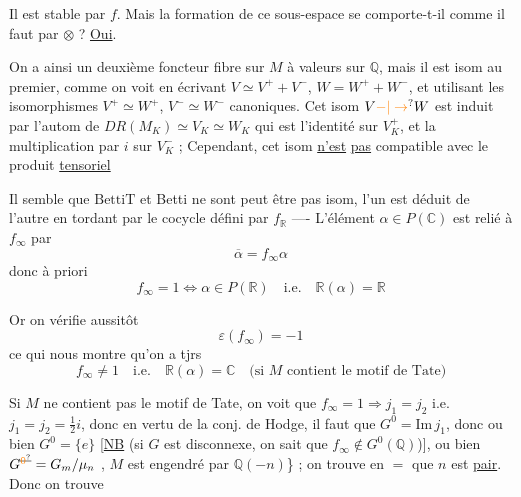 
Il est stable par $f$. Mais
la formation de ce sous-espace
 se comporte-t-il comme
il faut par $\otimes$ ? \uline{Oui}.

On a ainsi un deuxième foncteur fibre sur $M$
à valeurs sur $\mathbb Q$, mais il est isom  au
premier,  comme on voit en écrivant
$V\simeq V^++V^-$, $W=W^++W^-$, et utilisant les
isomorphismes $V^+\simeq W^+$, $V^-\simeq W^-$ canoniques.
Cet isom $V\unsure{-|\to}W$ est  induit par l'autom
de $DR(M_K)\simeq V_K\simeq W_K$ qui est l'identité sur
$V_K^+$, et la multiplication par $i$ sur $V_K^-$ ; Cependant, cet
isom \uline{n'est} \uline{pas} compatible avec le produit \uline{tensoriel}

Il semble que $\mathrm{Betti}\mathrm T$ et Betti ne sont  peut être pas isom,
l'un est déduit  de l'autre en tordant par le cocycle
défini par $f_{\mathbb R}$ ----
L'élément $\alpha\in P(\mathbb C)$ est relié à $f_\infty$ par
\[
\overline\alpha=f_\infty\alpha
\]
donc  à priori
\[
f_\infty=1\Longleftrightarrow\alpha\in P(\mathbb R)\quad\text{i.e.}\quad\mathbb R(\alpha)=\mathbb R
\]


Or on vérifie aussitôt
\[
\boxed{\varepsilon(f_\infty)=-1}
\]
ce qui nous montre qu'on a tjrs
\[
\boxed{f_\infty\ne1\quad\text{i.e.}\quad\mathbb R(\alpha)=\mathbb C}
\quad\text{(si $M$ contient le motif de Tate)}
\]

Si $M$ ne contient pas le motif de Tate, on voit
que $f_\infty=1\Longrightarrow j_1=j_2$ i.e. $j_1=j_2=\frac12 i$, donc en
vertu de la conj. de Hodge, il faut que
$G^0=\mathrm{Im}\,j_1$, donc ou bien $G^0=\{e\}$  
[\uline{NB} (si $G$ est disconnexe, on sait que
$f_\infty\notin G^0(\mathbb Q)$)], ou bien $G^{\deleted{\unsure{0}}}=G_m/\mu_n$ ,
$M$ est  engendré par $\mathbb Q(-n)$\} ; on trouve
en $=$  que $n$ est \uline{pair}. Donc on trouve

